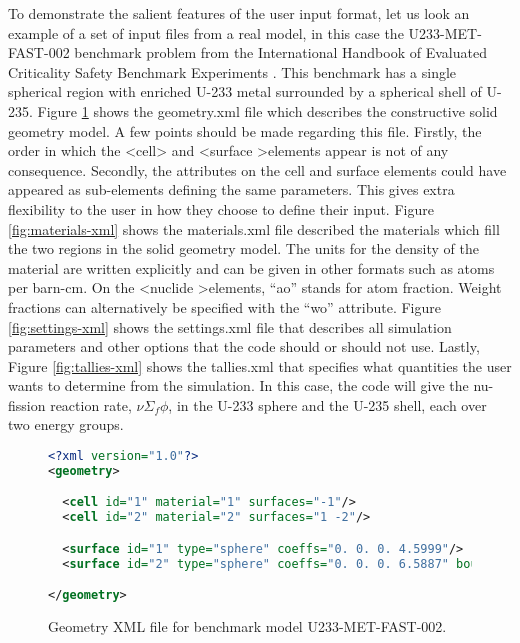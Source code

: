 \documentclass{elsarticle}
\begin{document}
To demonstrate the salient features of the user input format, let us look an
example of a set of input files from a real model, in this case the
U233-MET-FAST-002 benchmark problem from the International Handbook of Evaluated
Criticality Safety Benchmark Experiments \cite{icsbep}. This benchmark has a
single spherical region with enriched U-233 metal surrounded by a spherical
shell of U-235. Figure \ref{fig:geometry-xml} shows the geometry.xml file which
describes the constructive solid geometry model. A few points should be made
regarding this file. Firstly, the order in which the \textless cell\textgreater
and \textless surface \textgreater elements appear is not of any
consequence. Secondly, the attributes on the cell and surface elements could
have appeared as sub-elements defining the same parameters. This gives extra
flexibility to the user in how they choose to define their input. Figure
\ref{fig:materials-xml} shows the materials.xml file described the materials
which fill the two regions in the solid geometry model. The units for the
density of the material are written explicitly and can be given in other formats
such as atoms per barn-cm. On the \textless nuclide \textgreater elements,
``ao'' stands for atom fraction. Weight fractions can alternatively be specified
with the ``wo'' attribute. Figure \ref{fig:settings-xml} shows the settings.xml
file that describes all simulation parameters and other options that the code
should or should not use. Lastly, Figure \ref{fig:tallies-xml} shows the
tallies.xml that specifies what quantities the user wants to determine from the
simulation. In this case, the code will give the nu-fission reaction rate,
$\nu\Sigma_f\phi$, in the U-233 sphere and the U-235 shell, each over two energy
groups.

\begin{figure}
  \begin{lstlisting}[language=xml]
<?xml version="1.0"?>
<geometry>

  <cell id="1" material="1" surfaces="-1"/>
  <cell id="2" material="2" surfaces="1 -2"/>

  <surface id="1" type="sphere" coeffs="0. 0. 0. 4.5999"/>
  <surface id="2" type="sphere" coeffs="0. 0. 0. 6.5887" boundary="vacuum"/>

</geometry>
  \end{lstlisting}
  \caption{Geometry XML file for benchmark model U233-MET-FAST-002.}
  \label{fig:geometry-xml}
\end{figure}
\end{document}
